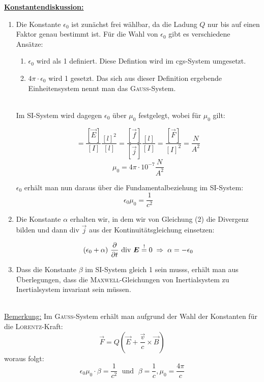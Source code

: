 \underline{\textbf{Konstantendiskussion:}}
\ \\
\begin{enumerate}
\item Die Konstante $\epsilon_0$ ist zunächst frei wählbar, da die Ladung $Q$ nur bis auf einen Faktor genau bestimmt ist. Für die Wahl von $\epsilon_0$ gibt es verschiedene Ansätze:\
\begin{enumerate}
\item $\epsilon_0$ wird als 1 definiert. Diese Defintion wird im cgs-System umgesetzt.\
\\
\item $4\pi\cdot\epsilon_0$ wird 1 gesetzt. Das sich aus dieser Definition ergebende Einheitensystem nennt man das \textsc{Gauss}-System.\
\end{enumerate}
\ \\
Im SI-System wird dagegen $\epsilon_0$ über $\mu_0$ festgelegt, wobei für $\mu_0$ gilt:

\begin{equation*}
[\mu_0] = \frac{[\vec{E}]}{[I]}\frac{[l]^2}{[l]}=\frac{[\vec{f}]}{[\vec{j}]}\frac{[l]}{[I]}=\frac{[\vec{F}]}{[I]^2}=\frac{N}{A^2}
\end{equation*}
\begin{equation*}
\mu_0 = 4\pi\cdot 10^{-7} \frac{N}{A^2}
\end{equation*}

$\epsilon_0$ erhält man nun daraus über die Fundamentalbeziehung im SI-System:
\begin{equation*}
\epsilon_0\mu_0 = \frac{1}{c^2}
\end{equation*}

\item
Die Konstante $\alpha$ erhalten wir, in dem wir von Gleichung (2) die Divergenz bilden und dann div $\vec{j}$ aus der Kontinuitätsgleichung einsetzen:

\begin{equation*}
(\epsilon_0 + \alpha) \ \pdiff{}{t} \ \text{div} \ \vec{E} \overset{!}{=} 0 \; \Rightarrow \; \alpha = -\epsilon_0 
\end{equation*}

\item
Dass die Konstante $\beta$ im SI-System gleich 1 sein musss, erhält man aus Überlegungen, dass die \textsc{Maxwell}-Gleichungen von Inertialsystem zu Inertialsystem invariant sein müssen.
\end{enumerate}
\ \\
\underline{Bemerkung:}
Im \textsc{Gauss}-System erhält man aufgrund der Wahl der Konstanten für die \textsc{Lorentz}-Kraft:
\begin{equation*}
\vec{F} = Q (\vec{E} + \frac{\vec{v}}{c}\times\vec{B})
\end{equation*}
woraus folgt:
\begin{equation*}
\epsilon_0\mu_0\cdot\beta = \frac{1}{c^2} \; \text{ und } \; \beta = \frac{1}{c}, \mu_0 = \frac{4\pi}{c}
\end{equation*}

